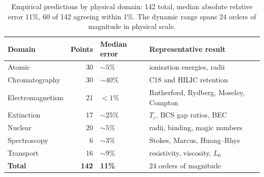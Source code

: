 \begin{table}[htbp]
\centering
\caption{Empirical predictions by physical domain: 142 total, median
absolute relative error 11\%, 60 of 142 agreeing within 1\%.
The dynamic range spans 24 orders of magnitude in physical scale.}
\label{tab:predictions-by-domain}
\begin{tabular}{@{}lrll@{}}
\toprule
Domain & Points & Median error & Representative result \\
\midrule
Atomic              & 30 & $\sim 5$\% & ionisation energies, radii \\
Chromatography      & 30 & $\sim 40$\% & C18 and HILIC retention \\
Electromagnetism    & 21 & $< 1$\% & Rutherford, Rydberg, Moseley, Compton \\
Extinction          & 17 & $\sim 25$\% & $T_c$, BCS gap ratios, BEC \\
Nuclear             & 20 & $\sim 5$\% & radii, binding, magic numbers \\
Spectroscopy        & 6  & $\sim 3$\% & Stokes, Marcus, Huang--Rhys \\
Transport           & 16 & $\sim 9$\% & resistivity, viscosity, $L_0$ \\
\midrule
\textbf{Total}      & \textbf{142} & \textbf{11\%} & 24 orders of magnitude \\
\bottomrule
\end{tabular}
\end{table}

